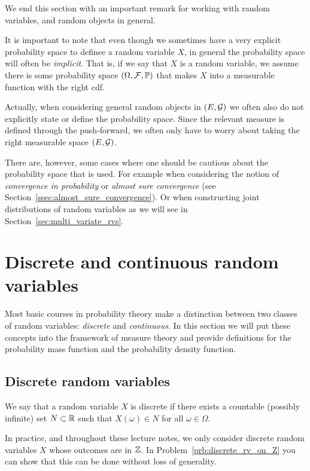We end this section with an important remark for working with random variables, and random objects in general.

\begin{remark}
It is important to note that even though we sometimes have a very explicit probability space to definee a random variable $X$, in general the probability space will often be \emph{implicit}. That is, if we say that $X$ is a random variable, we assume there is some probability space $(\Omega,\mathcal F, \mathbb P)$ that makes $X$ into a measurable function with the right cdf. 

Actually, when considering general random objects in $(E, \mathcal G)$ we often also do not explicitly state or define the probability space. Since the relevant measure is defined through the push-forward, we often only have to worry about taking the right measurable space $(E, \mathcal G)$.

There are, however, some cases where one should be cautious about the probability space that is used. For example when considering the notion of \emph{convergence in probability} or \emph{almost sure convergence} (see Section~\ref{ssec:almost_sure_convergence}). Or when constructing joint distributions of random variables as we will see in Section~\ref{sec:multi_variate_rvs}. 
\end{remark}

\section{Discrete and continuous random variables}

Most basic courses in probability theory make a distinction between two classes of random variables: \emph{discrete} and \emph{continuous}. In this section we will put these concepts into the framework of measure theory and provide definitions for the probability mass function and the probability density function.

\subsection{Discrete random variables}
We say that a random variable $X$ is discrete if there exists a countable (possibly infinite) set $N \subset \mathbb R$ such that $X(\omega) \in N$ for all $\omega \in \Omega$. 

In practice, and throughout these lecture notes, we only consider discrete random variables $X$ whose outcomes are in $\mathbb Z$. In Problem~\ref{prb:discrete_rv_on_Z} you can show that this can be done without loss of generality. 

